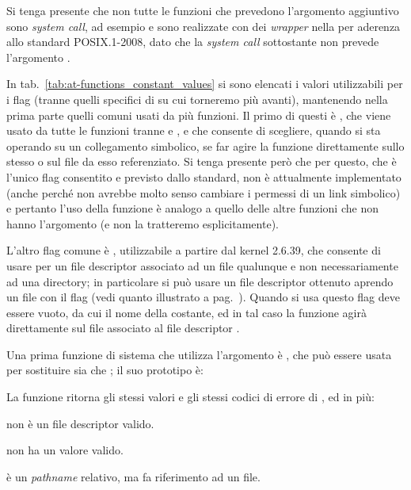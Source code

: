 Si tenga presente che non tutte le funzioni che prevedono l'argomento
aggiuntivo sono \textit{system call}, ad esempio  e
 sono realizzate con dei \textit{wrapper} nella  per
aderenza allo standard POSIX.1-2008, dato che la \textit{system call}
sottostante non prevede l'argomento . 

In tab.~\ref{tab:at-functions_constant_values} si sono elencati i valori
utilizzabili per i flag (tranne quelli specifici di  su cui
torneremo più avanti), mantenendo nella prima parte quelli comuni usati da più
funzioni. Il primo di questi è , che viene usato
da tutte le funzioni tranne  e , e che consente di
scegliere, quando si sta operando su un collegamento simbolico, se far agire
la funzione direttamente sullo stesso o sul file da esso referenziato. Si
tenga presente però che per  questo, che è l'unico flag
consentito e previsto dallo standard, non è attualmente implementato (anche
perché non avrebbe molto senso cambiare i permessi di un link simbolico) e
pertanto l'uso della funzione è analogo a quello delle altre funzioni che non
hanno l'argomento  (e non la tratteremo esplicitamente).

L'altro flag comune è , utilizzabile a partire dal
kernel 2.6.39, che consente di usare per  un file descriptor
associato ad un file qualunque e non necessariamente ad una directory; in
particolare si può usare un file descriptor ottenuto aprendo un file con il
flag  (vedi quanto illustrato a
pag.~\pageref{open_o_path_flag}). Quando si usa questo flag 
deve essere vuoto, da cui il nome della costante, ed in tal caso la funzione
agirà direttamente sul file associato al file descriptor .

Una prima funzione di sistema che utilizza l'argomento  è
, che può essere usata per sostituire sia  che
; il suo prototipo è:

\begin{funcproto}{
}

{La funzione ritorna gli stessi valori e gli stessi codici di errore di
  , ed in più:
  \begin{errlist}
  \item[\errcode{EBADF}]  non è un file descriptor valido.
  \item[\errcode{EINVAL}]  non ha un valore valido.
  \item[\errcode{ENOTDIR}]  è un \textit{pathname} relativo,
    ma  fa riferimento ad un file.
  \end{errlist}
}  
\end{funcproto}

